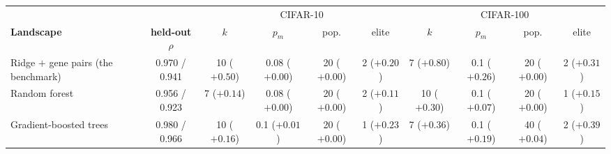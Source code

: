 \begin{tabular}{l c cccc cccc}
\toprule
& & \multicolumn{4}{c}{CIFAR-10} & \multicolumn{4}{c}{CIFAR-100} \\
\cmidrule(lr){3-6}\cmidrule(lr){7-10}
\textbf{Landscape} & \textbf{held-out} $\rho$ & $k$ & $p_m$ & pop. & elite & $k$ & $p_m$ & pop. & elite \\
\midrule
Ridge $+$ gene pairs (the benchmark) & 0.970 / 0.941 & 10 ($+0.50$) & 0.08 ($+0.00$) & 20 ($+0.00$) & 2 ($+0.20$) & 7 ($+0.80$) & 0.1 ($+0.26$) & 20 ($+0.00$) & 2 ($+0.31$) \\
Random forest & 0.956 / 0.923 & 7 ($+0.14$) & 0.08 ($+0.00$) & 20 ($+0.00$) & 2 ($+0.11$) & 10 ($+0.30$) & 0.1 ($+0.07$) & 20 ($+0.00$) & 1 ($+0.15$) \\
Gradient-boosted trees & 0.980 / 0.966 & 10 ($+0.16$) & 0.1 ($+0.01$) & 20 ($+0.00$) & 1 ($+0.23$) & 7 ($+0.36$) & 0.1 ($+0.19$) & 40 ($+0.04$) & 2 ($+0.39$) \\
\bottomrule
\end{tabular}
